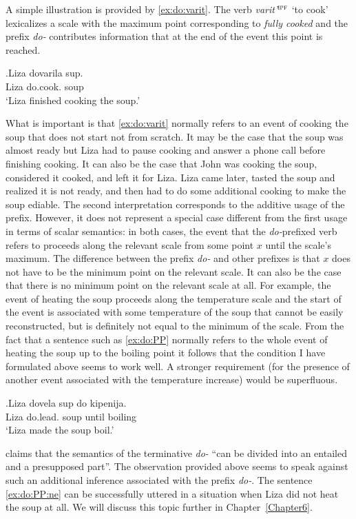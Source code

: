 A simple illustration is provided by \ref{ex:do:varit}. The verb \textit{varit'}$^{\textsc{ipf}}$ `to cook' lexicalizes a scale with the maximum point corresponding to \textit{fully cooked} and the prefix \textit{do-} contributes information that at the end of the event this point is reached. 

\exg.\label{ex:do:varit}Liza dovarila sup.\\
Liza do.cook. soup\\
\trans `Liza finished cooking the soup.'

What is important is that \ref{ex:do:varit} normally refers to an event of cooking the soup that does not start not from scratch. It may be the case that the soup was almost ready but Liza had to pause cooking and answer a phone call before finishing cooking. It can also be the case that John was cooking the soup, considered it cooked, and left it for Liza. Liza came later, tasted the soup and realized it is not ready, and then had to do some additional cooking to make the soup ediable. The second interpretation corresponds to the additive usage of the prefix. However, it does not represent a special case different from the first usage in terms of scalar semantics: in both cases, the event that the \textit{do-}prefixed verb refers to proceeds along the relevant scale from some point $x$ until the scale's maximum. The difference between the prefix \textit{do-} and other prefixes is that $x$ does not have to be the minimum point on the relevant scale. It can also be the case that there is no minimum point on the relevant scale at all. For example, the event of heating the soup proceeds along the temperature scale and the start of the event is associated with some temperature of the soup that cannot be easily reconstructed, but is definitely not equal to the minimum of the scale. From the fact that a sentence such as \ref{ex:do:PP} normally refers to the whole event of heating the soup up to the boiling point it follows that the condition I have formulated above seems to work well. A stronger requirement (for the presence of another event associated with the temperature increase) would be superfluous.

\exg.\label{ex:do:PP}Liza dovela sup do kipenija.\\
Liza do.lead. soup until boiling\\
\trans `Liza made the soup boil.'

\citet[75]{Kagan:book} claims that the semantics of the terminative \textit{do-} ``can be divided into an entailed and a presupposed part''. The observation provided above seems to speak against such an additional inference associated with the prefix \textit{do-}. The sentence \ref{ex:do:PP:ne} can be successfully uttered in a situation when Liza did not heat the soup at all. We will discuss this topic further in Chapter~\ref{Chapter6}.


